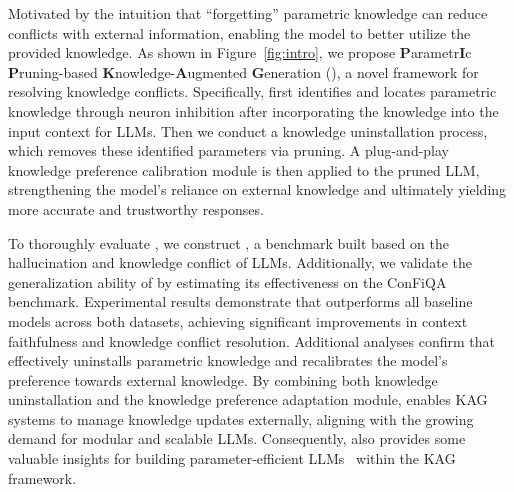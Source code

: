 Motivated by the intuition that ``forgetting'' parametric knowledge can reduce conflicts with external information, enabling the model to better utilize the provided knowledge. As shown in Figure~\ref{fig:intro}, we propose \textbf{P}arametr\textbf{I}c \textbf{P}runing-based \textbf{K}nowledge-\textbf{A}ugmented \textbf{G}eneration (\method{}), a novel framework for resolving knowledge conflicts. Specifically, \method{} first identifies and locates parametric knowledge through neuron inhibition after incorporating the knowledge into the input context for LLMs. Then we conduct a knowledge uninstallation process, which removes these identified parameters via pruning. A plug-and-play knowledge preference calibration module is then applied to the pruned LLM, strengthening the model's reliance on external knowledge and ultimately yielding more accurate and trustworthy responses.


To thoroughly evaluate \method{}, we construct \dataset{}, a benchmark built based on the hallucination and knowledge conflict of LLMs. Additionally, we validate the generalization ability of \method{} by estimating its effectiveness on the ConFiQA benchmark. Experimental results demonstrate that \method{} outperforms all baseline models across both datasets, achieving significant improvements in context faithfulness and knowledge conflict resolution. Additional analyses confirm that \method{} effectively uninstalls parametric knowledge and recalibrates the model's preference towards external knowledge. By combining both knowledge uninstallation and the knowledge preference adaptation module, \method{} enables KAG systems to manage knowledge updates externally, aligning with the growing demand for modular and scalable LLMs. Consequently, \method{} also provides some valuable insights for building parameter-efficient LLMs~\cite{asai2024reliable} within the KAG framework.
